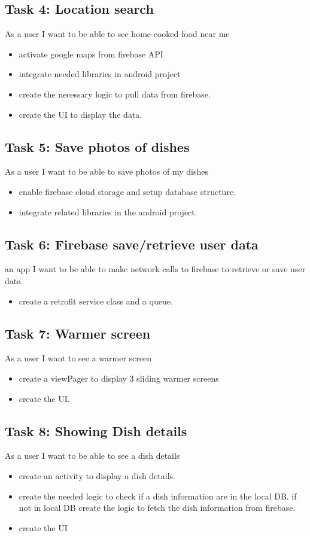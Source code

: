 \documentclass{article}
\begin{document}
\subsection{Task 4: Location search}
	As a user I want to be able to see home-cooked food near me 
  \begin{itemize}
    \item activate google maps from firebase API
    \item integrate needed libraries in android project
    \item create the necessary logic to pull data from firebase.
    \item create the UI to display the data.
  \end{itemize}

\subsection{Task 5: Save photos of dishes}
	As a user I want to be able to save photos of my dishes
\begin{itemize}
  \item enable firebase cloud storage and setup database structure.
  \item integrate related libraries in the android project.
\end{itemize}

\subsection{Task 6: Firebase save/retrieve user data}
an app I want to be able to make network calls to firebase to retrieve or save user data 
\begin{itemize} 
  \item create a retrofit service class and a queue.
\end{itemize}

\subsection{Task 7: Warmer screen}
	As a user I want to see a warmer screen
  \begin{itemize}
    \item create a viewPager to display 3 sliding warmer screens
    \item create the UI.
  \end{itemize}

\subsection{Task 8: Showing Dish details}
	As a user I want to be able to see a dish details 
  \begin{itemize}
    \item create an activity to display a dish details.
    \item create the needed logic to check if a dish information are in the local DB. if not in local    DB create the logic to fetch the dish information from firebase.
    \item create the UI
  \end{itemize}
\end{document}
